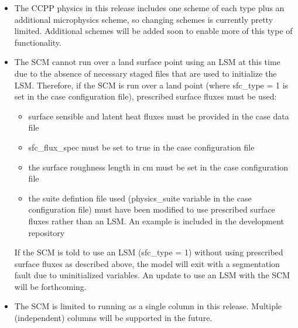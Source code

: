 \begin{itemize}
\item The CCPP physics in this release includes one scheme of each type plus an additional microphysics scheme, so changing schemes is currently pretty limited. Additional schemes will be added soon to enable more of this type of functionality.
\item The SCM cannot run over a land surface point using an LSM at this time due to the absence of necessary staged files that are used to initialize the LSM. Therefore, if the SCM is run over a land point (where sfc\_type = 1 is set in the case configuration file), prescribed surface fluxes must be used:
\begin{itemize}
\item surface sensible and latent heat fluxes must be provided in the case data file
\item sfc\_flux\_spec must be set to true in the case configuration file
\item the surface roughness length in cm must be set in the case configuration file
\item the suite defintion file used (physics\_suite variable in the case configuration file) must have been modified to use prescribed surface fluxes rather than an LSM. An example is included in the development repository
\end{itemize}
If the SCM is told to use an LSM (sfc\_type = 1) without using prescribed surface fluxes as described above, the model will exit with a segmentation fault due to uninitialized variables. An update to use an LSM with the SCM will be forthcoming.
\item The SCM is limited to running as a single column in this release. Multiple (independent) columns will be supported in the future.
\end{itemize}
